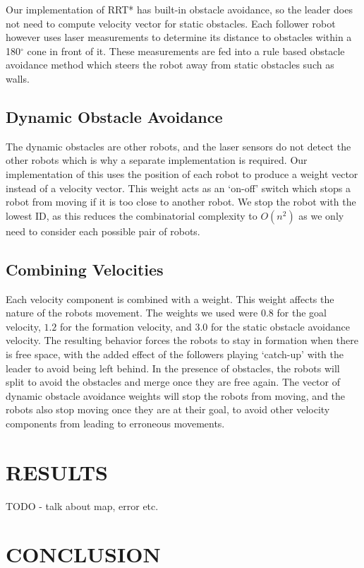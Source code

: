 \documentclass[letterpaper, 10 pt, conference]{ieeeconf}  %
\begin{document}
Our implementation of RRT* has built-in obstacle avoidance, so the leader does not need to compute velocity vector for static obstacles. Each follower robot however uses laser measurements to determine its distance to obstacles within a 180$^{\circ}$ cone in front of it. These measurements are fed into a rule based obstacle avoidance method which steers the robot away from static obstacles such as walls.

\subsection{Dynamic Obstacle Avoidance}

The dynamic obstacles are other robots, and the laser sensors do not detect the other robots which is why a separate implementation is required. Our implementation of this uses the position of each robot to produce a weight vector instead of a velocity vector. This weight acts as an `on-off' switch which stops a robot from moving if it is too close to another robot. We stop the robot with the lowest ID, as this reduces the combinatorial complexity to $O(n^{2})$ as we only need to consider each possible pair of robots.

\subsection{Combining Velocities}

Each velocity component is combined with a weight. This weight affects the nature of the robots movement. The weights we used were $0.8$ for the goal velocity, $1.2$ for the formation velocity, and $3.0$ for the static obstacle avoidance velocity. The resulting behavior forces the robots to stay in formation when there is free space, with the added effect of the followers playing `catch-up' with the leader to avoid being left behind. In the presence of obstacles, the robots will split to avoid the obstacles and merge once they are free again. The vector of dynamic obstacle avoidance weights will stop the robots from moving, and the robots also stop moving once they are at their goal, to avoid other velocity components from leading to erroneous movements.

\section{RESULTS}

TODO - talk about map, error etc.

\section{CONCLUSION}
\end{document}

